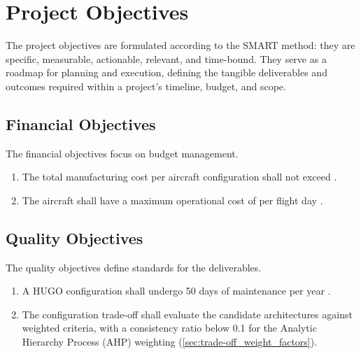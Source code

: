 \chapter{Project Objectives}
\label{ch:project_objectives}

The project objectives are formulated according to the SMART method: they are specific, measurable, actionable, relevant, and time-bound. They serve as a roadmap for planning and execution, defining the tangible deliverables and outcomes required within a project’s timeline, budget, and scope.



\section{Financial Objectives}
The financial objectives focus on budget management.
\begin{enumerate}
    \item The total manufacturing cost per aircraft configuration shall not exceed  .
    \item The aircraft shall have a maximum operational cost of  per flight day .
\end{enumerate}

\section{Quality Objectives}
The quality objectives define standards for the deliverables.

\begin{enumerate}
    \item A HUGO configuration shall undergo 50 days of maintenance per year .
    \item The configuration trade-off shall evaluate the candidate architectures against weighted criteria, with a consistency ratio below 0.1 for the Analytic
    Hierarchy Process (AHP) weighting (\autoref{sec:trade-off_weight_factors}).
\end{enumerate}

